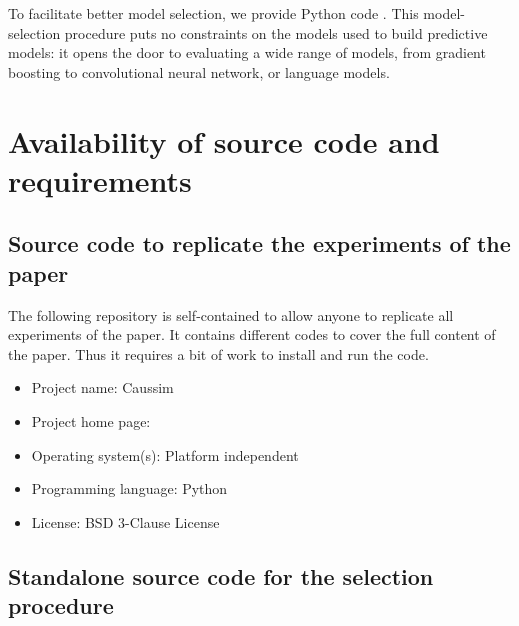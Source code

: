 \documentclass[a4paper,num-refs]{oup-contemporary}%
\begin{document}
To facilitate better model selection, we provide Python
code \cite{doutreligne2025causal}.
This model-selection procedure puts no constraints on the models used to
build predictive models: it opens the door to evaluating a wide range of
models, from gradient boosting to convolutional neural network, or language
models.




\section{Availability of source code and requirements}

\subsection{Source code to replicate the experiments of the paper}

The following repository is self-contained to allow anyone to replicate all experiments of the paper. It contains different codes to cover the full content of the paper. Thus it requires a bit of work to install and run the code.

\begin{itemize}
    \item Project name: Caussim
    \item Project home page: \cite{doutreligne2025caussim}
    \item Operating system(s): Platform independent
    \item Programming language: Python
    \item License: BSD 3-Clause License
\end{itemize}


\subsection{Standalone source code for the selection procedure}
\end{document}
